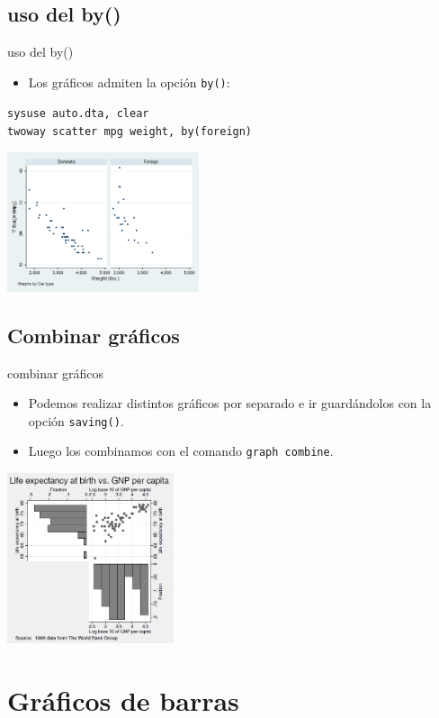 \documentclass{beamer}
\begin{document}
\subsection{uso del by()}
\begin{frame}{uso del by()}
\begin{itemize}
\item Los gráficos admiten la opción \texttt{by()}:
\end{itemize}
{\footnotesize \texttt{sysuse auto.dta, clear}}\\
{\footnotesize \texttt{twoway scatter mpg weight, by(foreign)}}\\\medskip
\centerline{\includegraphics[height=4.1cm]{by.png}}
\end{frame}

\subsection{Combinar gráficos}

\begin{frame}{combinar gráficos}
\begin{itemize}
\item Podemos realizar distintos gráficos por separado e ir guardándolos con la opción \texttt{saving()}.
\item Luego los combinamos con el comando \texttt{graph combine}.
\end{itemize}
\centerline{\includegraphics[height=5cm]{graf4.jpg}}
\end{frame}

\section{Gráficos de barras}
\end{document}
